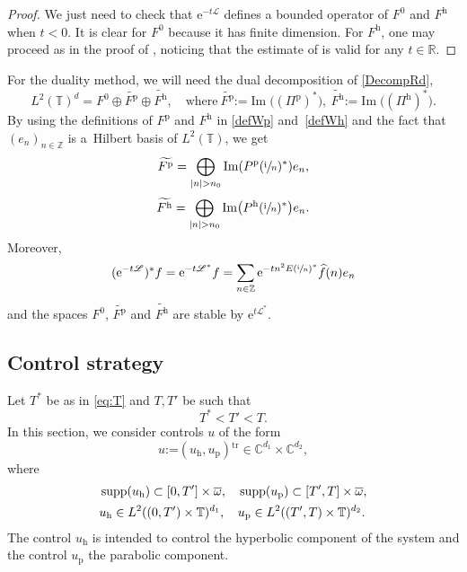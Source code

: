 \documentclass[10pt]{amsart}
\let\mathcal\mathscr
\theoremstyle{plain}
\theoremstyle{definition}
\theoremstyle{remark}
\DeclareMathOperator{\Ima}{Im}
\DeclareMathOperator{\Supp}{supp}
\newcommand{\set}{\mathbb}
\newcommand{\Z}{\set{Z}}
\newcommand{\R}{} %
\renewcommand{\R}{\set{R}}
\renewcommand{\C}{\set{C}}
\newcommand{\T}{\set{T}}
\newcommand{\Tr}[1]{{#1}{}^{\mathrm{tr}}}
\newcommand{\coloneqq}{\mathrel{\mathord{:}\mathord=}}
\newcommand{\h}{{\mathrm h}}
\newcommand{\p}{{\mathrm p}}
\newcommand{\eu}{\mathrm e}
\newcommand{\iu}{\mathrm i}
\let\originalleft\left
\let\originalright\right
\renewcommand{\left}{\mathopen{}\mathclose\bgroup\originalleft}
\renewcommand{\right}{\aftergroup\egroup\originalright}
\begin{document}
\begin{proof}
We just need to check that $\eu^{-t\mathcal{L}}$ defines a bounded operator of $F^0$ and $F^\h$ when $t<0$. It is clear for $F^0$ because it has finite dimension. For $F^\h$, one may proceed as in the proof of , noticing that the estimate of  is valid for any $t\in\R$.
\end{proof}

For the duality method, we will need the dual decomposition of \eqref{DecompRd}, \ie
\begin{equation}
\label{duadecomp}
L^2(\T)^{d} = F^0 \oplus \widetilde{F^\p} \oplus \widetilde{F^\h},\quad
\text{where}\ \widetilde{F^\p} \coloneqq \Ima\big((\Pi^{\p})^{*}\big),\ \widetilde{F^\h} \coloneqq \Ima \bigl((\Pi^{\h})^{*} \bigr).
\end{equation}
By using the definitions of $F^\p$ and $F^\h$ in \eqref{defWp} and~\eqref{defWh} and the fact that $(e_n)_{n \in \Z}$ is a~Hilbert basis of $L^2(\T)$, we get
\begin{equation}
\label{defWptilde}
\widetilde{F^{\p}} =\bigoplus\limits_{|n| > n_0} \Ima\left(P^\p(\sfrac{\iu}{n})^\ast\right) e_n,
\end{equation}
\begin{equation}
\label{defWhtilde}
\widetilde{F^{\h}} =\bigoplus\limits_{|n| > n_0} \Ima\left(P^\h(\sfrac{\iu}{n})^\ast\right) e_n.
\end{equation}
Moreover,
\begin{equation}\label{eq:adj_semigroup}
(\eu^{-t\mathcal L})^\ast f = \eu^{-t\mathcal L^\ast} f= \sum_{n\in\set Z} \eu^{-tn^2 E\left(\sfrac{\iu}{n}\right)^\ast} \widehat{f}(n) e_n
\end{equation}
and the spaces $F^0$, $\widetilde{F^\p}$ and $\widetilde{F^\h}$ are stable by $\eu^{t\mathcal L^\ast}$.

\subsection{Control strategy} \label{subsec:CS}

Let $T^{*}$ be as in \eqref{eq:T} and $T, T'$ be such that
\begin{equation}
T^\ast < T' < T.
\label{defTT'}
\end{equation}
In this section, we consider controls $u$ of the form
\begin{equation}
\label{DecompH}
u \coloneqq \Tr{(u_{\h}, u_{\p})} \in \C^{d_1} \times \C^{d_2},
\end{equation}
where
\begin{align}
&\Supp(u_{\h}) \subset [0,T']\times\overline \omega,&& \Supp(u_{\p}) \subset [T',T] \times \overline \omega,
\label{suppHhHp}
\\\notag
&u_{\h} \in L^2((0,T')\times\T)^{d_1}, && u_{\p} \in L^2((T',T)\times\T)^{d_2}.
\end{align}
The control $u_{\h}$ is intended to control the hyperbolic component of the system and the control $u_{\p}$ the parabolic component.
\end{document}
